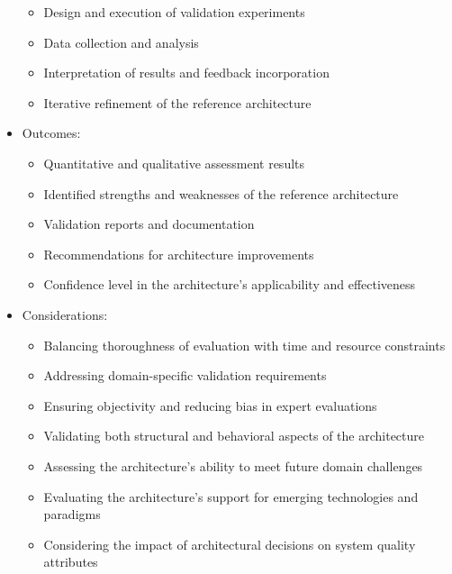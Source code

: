 \documentclass[12pt,a4paper]{article}
\begin{document}
\begin{itemize}
\begin{itemize}
        \item Design and execution of validation experiments
        \item Data collection and analysis
        \item Interpretation of results and feedback incorporation
        \item Iterative refinement of the reference architecture
    \end{itemize}
    \item Outcomes:
    \begin{itemize}
        \item Quantitative and qualitative assessment results
        \item Identified strengths and weaknesses of the reference architecture
        \item Validation reports and documentation
        \item Recommendations for architecture improvements
        \item Confidence level in the architecture's applicability and effectiveness
    \end{itemize}
    \item Considerations:
    \begin{itemize}
        \item Balancing thoroughness of evaluation with time and resource constraints
        \item Addressing domain-specific validation requirements
        \item Ensuring objectivity and reducing bias in expert evaluations
        \item Validating both structural and behavioral aspects of the architecture
        \item Assessing the architecture's ability to meet future domain challenges
        \item Evaluating the architecture's support for emerging technologies and paradigms \citep{Nakagawa2023}
        \item Considering the impact of architectural decisions on system quality attributes \citep{Bass2003}
    \end{itemize}
\end{itemize}
\end{document}
